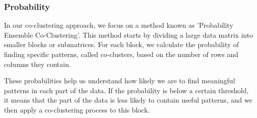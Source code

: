 




\subsubsection{Probability}
In our co-clustering approach, we focus on a method known as 'Probability Ensemble Co-Clustering'. This method starts by dividing a large data matrix into smaller blocks or submatrices. For each block, we calculate the probability of finding specific patterns, called co-clusters, based on the number of rows and columns they contain.

These probabilities help us understand how likely we are to find meaningful patterns in each part of the data. If the probability is below a certain threshold, it means that the part of the data is less likely to contain useful patterns, and we then apply a co-clustering process to this block.

